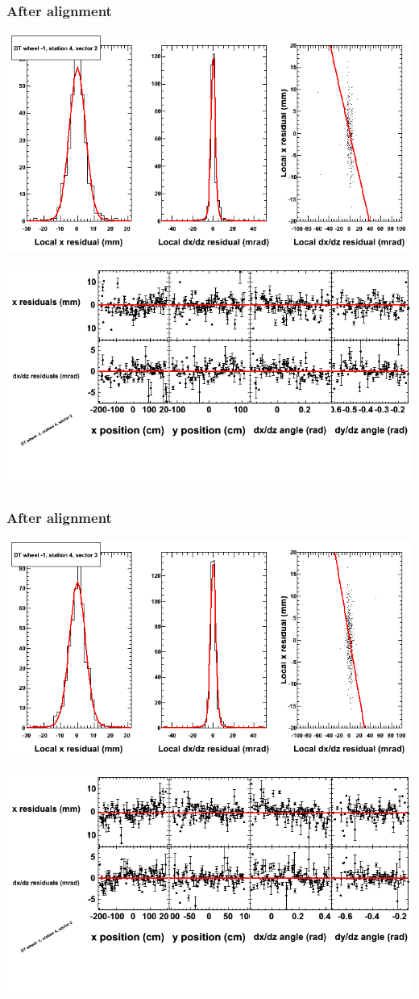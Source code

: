 \documentclass[compress]{beamer}
\begin{document}
\begin{frame}
\frametitle{After alignment}
\includegraphics[width=0.7\linewidth]{NOV4_fitfunctions/MBwhBst4sec02_bellcurves.png}

\includegraphics[width=0.7\linewidth]{NOV4_fitfunctions/MBwhBst4sec02_polynomials.png}
\end{frame}

\begin{frame}
\frametitle{After alignment}
\includegraphics[width=0.7\linewidth]{NOV4_fitfunctions/MBwhBst4sec03_bellcurves.png}

\includegraphics[width=0.7\linewidth]{NOV4_fitfunctions/MBwhBst4sec03_polynomials.png}
\end{frame}
\end{document}

